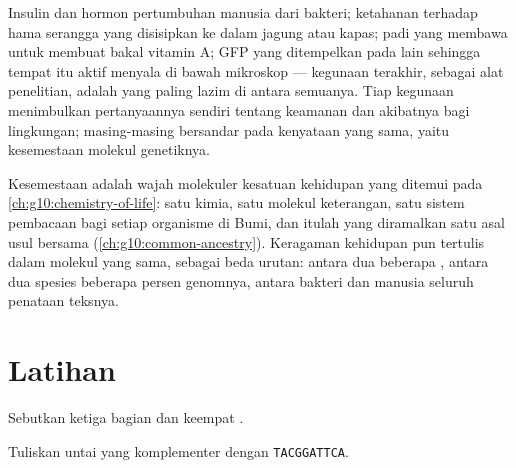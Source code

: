 \begin{example}\label{ex:g10:universal-dna:uses}
Insulin dan hormon pertumbuhan manusia dari bakteri;  ketahanan
terhadap hama serangga yang disisipkan ke dalam jagung atau kapas; padi
yang membawa  untuk membuat bakal vitamin A;  GFP yang
ditempelkan pada  lain sehingga  tempat  itu aktif menyala di
bawah mikroskop --- kegunaan terakhir, sebagai alat penelitian, adalah
yang paling lazim di antara semuanya. Tiap kegunaan menimbulkan
pertanyaannya sendiri tentang keamanan dan akibatnya bagi lingkungan;
masing-masing bersandar pada kenyataan yang sama, yaitu kesemestaan
molekul genetiknya.
\end{example}

\begin{remark}\label{rem:g10:universal-dna:unity}
Kesemestaan  adalah wajah molekuler kesatuan kehidupan yang ditemui
pada \cref{ch:g10:chemistry-of-life}: satu kimia, satu molekul
keterangan, satu sistem pembacaan bagi setiap organisme di Bumi, dan
itulah yang diramalkan satu asal usul bersama
(\cref{ch:g10:common-ancestry}). Keragaman kehidupan pun tertulis dalam
molekul yang sama, sebagai beda urutan: antara dua  beberapa ,
antara dua spesies beberapa persen genomnya, antara bakteri dan manusia
seluruh penataan teksnya.
\end{remark}

\section{Latihan}

\begin{exercise}[$\star$]\label{exo:g10:universal-dna:1}
Sebutkan ketiga bagian  dan keempat  .
\end{exercise}

\begin{exercise}[$\star$]\label{exo:g10:universal-dna:2}
Tuliskan untai yang komplementer dengan \texttt{TACGGATTCA}.
\end{exercise}

